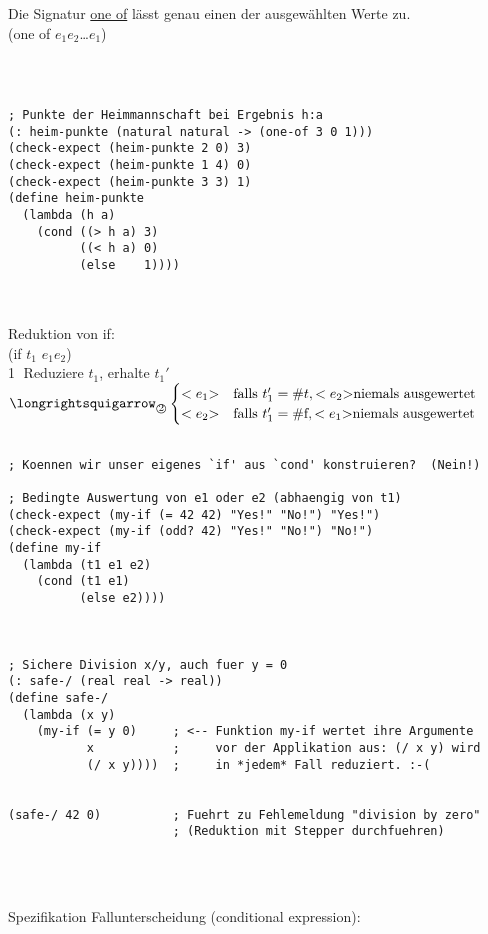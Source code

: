 Die Signatur \underline{one of} lässt genau einen der ausgewählten Werte zu.\\
(one of \auf $e_1$\zu \auf$e_2$\zu \ldots \auf $e_1$\zu)\\
\begin{lstlisting}[frame=single]
    


; Punkte der Heimmannschaft bei Ergebnis h:a
(: heim-punkte (natural natural -> (one-of 3 0 1)))
(check-expect (heim-punkte 2 0) 3)
(check-expect (heim-punkte 1 4) 0)
(check-expect (heim-punkte 3 3) 1)
(define heim-punkte
  (lambda (h a)
    (cond ((> h a) 3)
          ((< h a) 0)
          (else    1))))


\end{lstlisting}
\linie\\
Reduktion von if:\\
(if $t_1$ \auf $e_1$\zu \auf $e_2$\zu)\\
\textcircled{1} Reduziere $t_1$, erhalte $t_1'$ $\t{\eval}_\text{\textcircled{2}} 
\begin{cases}
<e_1\t{\zu} &\t{falls } t_1' = \#t, <e_2\t{\zu niemals ausgewertet}\\
<e_2\t{\zu} &\t{falls } t_1' = \#\t{f}, <e_1\t{\zu niemals ausgewertet}  
\end{cases}$\\
\begin{lstlisting}[frame=listing]

; Koennen wir unser eigenes `if' aus `cond' konstruieren?  (Nein!)

; Bedingte Auswertung von e1 oder e2 (abhaengig von t1)
(check-expect (my-if (= 42 42) "Yes!" "No!") "Yes!")
(check-expect (my-if (odd? 42) "Yes!" "No!") "No!")
(define my-if
  (lambda (t1 e1 e2)
    (cond (t1 e1)
          (else e2))))



; Sichere Division x/y, auch fuer y = 0
(: safe-/ (real real -> real))
(define safe-/
  (lambda (x y)
    (my-if (= y 0)     ; <-- Funktion my-if wertet ihre Argumente
           x           ;     vor der Applikation aus: (/ x y) wird
           (/ x y))))  ;     in *jedem* Fall reduziert. :-(


(safe-/ 42 0)          ; Fuehrt zu Fehlemeldung "division by zero"
                       ; (Reduktion mit Stepper durchfuehren)



\end{lstlisting}
\linie\\
Spezifikation Fallunterscheidung (conditional expression):\\
